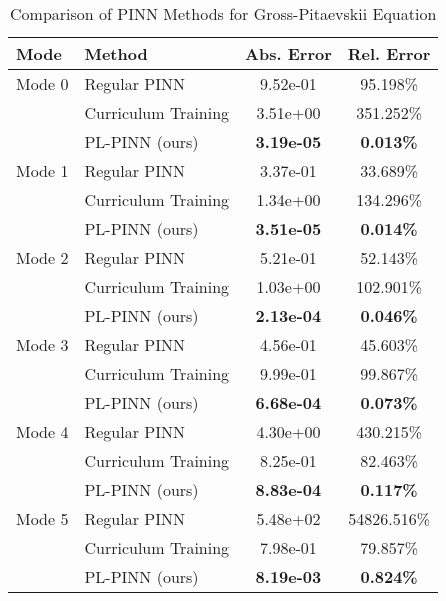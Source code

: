 \begin{table}[htbp]
\centering
\caption{Comparison of PINN Methods for Gross-Pitaevskii Equation}
\label{tab:pinn_comparison}
\begin{tabular}{llcc}
\toprule
Mode & Method & Abs. Error & Rel. Error \\
\midrule
Mode 0 & Regular PINN & 9.52e-01 & 95.198\% \\
 & Curriculum Training & 3.51e+00 & 351.252\% \\
 & PL-PINN (ours) & \textbf{3.19e-05} & \textbf{0.013\%} \\
\midrule
Mode 1 & Regular PINN & 3.37e-01 & 33.689\% \\
 & Curriculum Training & 1.34e+00 & 134.296\% \\
 & PL-PINN (ours) & \textbf{3.51e-05} & \textbf{0.014\%} \\
\midrule
Mode 2 & Regular PINN & 5.21e-01 & 52.143\% \\
 & Curriculum Training & 1.03e+00 & 102.901\% \\
 & PL-PINN (ours) & \textbf{2.13e-04} & \textbf{0.046\%} \\
\midrule
Mode 3 & Regular PINN & 4.56e-01 & 45.603\% \\
 & Curriculum Training & 9.99e-01 & 99.867\% \\
 & PL-PINN (ours) & \textbf{6.68e-04} & \textbf{0.073\%} \\
\midrule
Mode 4 & Regular PINN & 4.30e+00 & 430.215\% \\
 & Curriculum Training & 8.25e-01 & 82.463\% \\
 & PL-PINN (ours) & \textbf{8.83e-04} & \textbf{0.117\%} \\
\midrule
Mode 5 & Regular PINN & 5.48e+02 & 54826.516\% \\
 & Curriculum Training & 7.98e-01 & 79.857\% \\
 & PL-PINN (ours) & \textbf{8.19e-03} & \textbf{0.824\%} \\
\bottomrule
\end{tabular}
\end{table}
